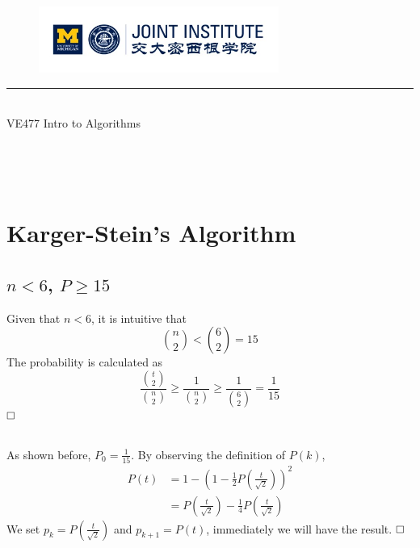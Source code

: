 \documentclass{article}
\newcommand{\qedhere}{$\hfill\ensuremath{\square}$}
\begin{document}
\setmainfont{Cormorant Upright}
\renewcommand\arraystretch{1.5}


\thispagestyle{empty}

\begin{center}
\begin{large}
\begin{figure}[!htbp]
\centering
\includegraphics[width=0.7\textwidth]{Logo2}
\end{figure}
\hrule
\vspace*{0.25cm}
 \\
\Large  VE477 Intro to Algorithms\\
\end{large}
\hrulefill

\vspace*{3cm}

\begin{Large}
 \\
\end{Large}
\vspace*{2cm}
\begin{large}
 \\
\end{large}
\end{center}
\newpage
\setmainfont{Optima}
\setmonofont{Optima}
\setsansfont{Optima}
\setcounter{page}{1}
\section{Karger-Stein’s Algorithm}
\subsection{$n<6$, $P \geq 15$}
Given that $n<6$, it is intuitive that
\[
	\binom{n}{2} < \binom{6}{2} = 15 
\]
The probability is calculated as
\[
	\frac{\binom{t}{2}}{\binom{n}{2}}\geq \frac{1}{\binom{n}{2}} \geq \frac{1}{\binom{6}{2}} = \frac{1}{15}
\]		
\qedhere
\subsection{}
As shown before, $P_0 = \frac{1}{15}$.
By observing the definition of $P(k)$,
\[
	\begin{aligned}
	P(t) &= 1- (1- \frac{1}{2}P(\frac{t}{\sqrt{2}}))^2\\
		&= P(\frac{t}{\sqrt{2}}) - \frac{1}{4} P(\frac{t}{\sqrt{2}})
	\end{aligned}
\]
We set $p_k = P(\frac{t}{\sqrt{2}})$ and $p_{k+1} = P(t)$, immediately we will have the result.
\qedhere
\end{document}
